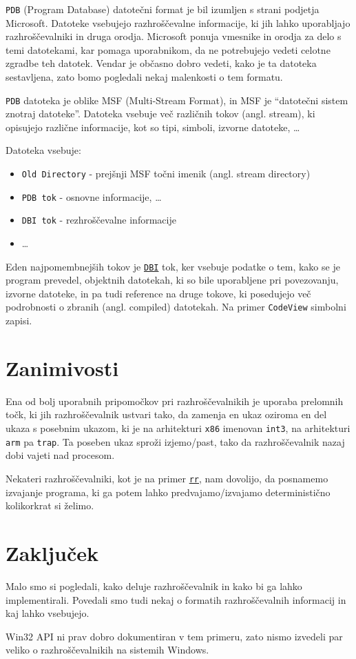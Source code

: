 \documentclass[a4paper,notitlepage]{article}
\newcommand{\code}[1]{\texttt{#1}}
\begin{document}
\code{PDB}\cite{llvm-pdb} (Program Database) datotečni format je bil izumljen s strani podjetja Microsoft. Datoteke vsebujejo razhroščevalne informacije, ki jih lahko uporabljajo razhroščevalniki in druga orodja.
Microsoft ponuja vmesnike in orodja za delo s temi datotekami, kar pomaga uporabnikom, da ne potrebujejo vedeti celotne zgradbe teh datotek.
Vendar je občasno dobro vedeti, kako je ta datoteka sestavljena, zato bomo pogledali nekaj malenkosti o tem formatu.

\code{PDB} datoteka je oblike MSF (Multi-Stream Format), in MSF je ``datotečni sistem znotraj datoteke''. Datoteka vsebuje več različnih tokov (angl. stream), ki opisujejo različne informacije, kot so tipi, simboli, izvorne datoteke, \ldots

Datoteka vsebuje:
\begin{itemize}
    \item \code{Old Directory} -  prejšnji MSF točni imenik (angl. stream directory)
    \item \code{PDB tok} - osnovne informacije, \ldots
    \item \code{DBI tok} - rezhroščevalne informacije
    \item \ldots
\end{itemize}

Eden najpomembnejših tokov je \href{https://llvm.org/docs/PDB/DbiStream.html}{\code{DBI}} tok, ker vsebuje podatke o tem, kako se je program prevedel, objektnih datotekah, ki so bile uporabljene pri povezovanju, izvorne datoteke, in pa tudi reference na druge tokove, ki posedujejo več podrobnosti o zbranih (angl. compiled) datotekah. Na primer \code{CodeView} simbolni zapisi.

\section{Zanimivosti}

Ena od bolj uporabnih pripomočkov pri razhroščevalnikih je uporaba prelomnih točk, ki jih razhroščevalnik ustvari tako, da zamenja en ukaz oziroma en del ukaza s posebnim ukazom, ki je na arhitekturi \code{x86} imenovan \code{int3}, na arhitekturi \code{arm} pa 
\code{trap}. Ta poseben ukaz sproži izjemo/past, tako da razhroščevalnik nazaj dobi vajeti nad procesom.

Nekateri razhroščevalniki, kot je na primer \href{https://rr-project.org/}{\code{rr}}, nam dovolijo, da posnamemo izvajanje programa, ki ga potem lahko predvajamo/izvajamo deterministično kolikorkrat si želimo.

\section{Zaključek}
Malo smo si pogledali, kako deluje razhroščevalnik in kako bi ga lahko implementirali. Povedali smo tudi nekaj o formatih razhroščevalnih informacij in kaj lahko vsebujejo.

Win32 API ni prav dobro dokumentiran v tem primeru, zato nismo izvedeli par veliko o razhroščevalnikih na sistemih Windows.

\nocite{*} %


\end{document}

